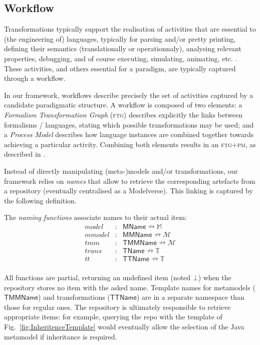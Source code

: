 \subsection{Workflow}
\label{sec:Workflow}

Transformations typically support the realisation of activities that are
essential to (the engineering of) languages, typically for parsing and/or pretty
printing, defining their semantics (translationally or operationnaly), analysing
relevant properties, debugging, and of course executing, simulating, animating,
etc. \cite{J:Lucio-Amrani-etAl:2014}.
These activities, and others essential for a paradigm, are typically captured
through a workflow.

In our framework, workflows describe precisely the set of activities captured by
a candidate paradigmatic structure. A workflow is composed of two elements:
a \emph{Formalism Transformation Graph} (\textsc{ftg}) describes explicitly the
links between formalisms / languages, stating which possible transformations may
be used; and a \emph{Process Model} describes how language instances are
combined together towards achieving a particular activity.
Combining both elements results in an \textsc{ftg+pm}, as described in
\cite{Mustafiz-etAl:2012,Lucio-Mustafiz-etAl:2013,TR:Lucio-Mustafiz-etAl:2012}.

Instead of directly manipulating (meta-)models and/or transformations, our 
framework relies on \emph{names} that allow to retrieve the corresponding 
artefacts from a repository (eventually centralised as a Modelverse). This 
linking is captured by the following definition.

\begin{Definition}
   The \emph{naming functions} associate names to their actual item:
   \begin{displaymath}
      \begin{array}{rcl}
         model  &\colon& \mathsf{MName} \nrightarrow \mathbb{M}\\
         mmodel &\colon& \mathsf{MMName} \nrightarrow \mathcal{M}\\
         tmm    &\colon& \mathsf{TMMName} \nrightarrow \mathcal{M}\\
         trans  &\colon& \mathsf{TName} \nrightarrow \mathbb{T}\\
         tt     &\colon& \mathsf{TTName} \nrightarrow \mathbb{T}\\
      \end{array}
   \end{displaymath}
\end{Definition}
\noindent
All functions are partial, returning an undefined item (noted $\bot$) when the 
repository stores no item with the asked name. 
Template names for metamodels 
($\mathsf{TMMName}$) and transformations ($\mathsf{TTName}$) are in a separate 
namespace than those for regular ones. 
The repository is ultimately responsible 
to retrieve appropriate items: for example, querying the repo with the template 
of Fig.~\ref{fig:InheritenceTemplate} would eventually allow the selection of 
the Java metamodel if inheritance is required.

